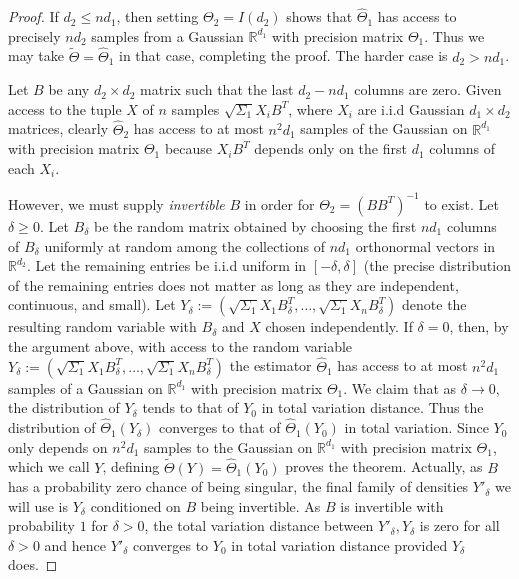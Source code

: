 \documentclass[aos]{imsart}
\theoremstyle{definition}
\numberwithin{equation}{section}
\newcommand{\R}{{\mathbb{R}}}
\newcommand{\htheta}{\widehat{\Theta}}
\begin{document}
\begin{proof}
If $d_2 \leq nd_1$, then setting $\Theta_2 = I(d_2)$ shows that $\htheta_1$ has access to precisely $n d_2$ samples from a Gaussian $\R^{d_1}$ with precision matrix $\Theta_1$. Thus we may take $\tilde{\Theta} = \htheta_1$ in that case, completing the proof. The harder case is $d_2 > n d_1$. 

Let $B$ be any $d_2\times d_2$ matrix such that the last $d_2 - nd_1$ columns are zero. Given access to the tuple $X$ of $n$ samples $\sqrt{\Sigma_1} X_i B^T$, where $X_i$ are i.i.d Gaussian $d_1\times d_2$ matrices, clearly $\widehat{\Theta}_2$ has access to at most $n^2 d_1$ samples of the Gaussian on $\R^{d_1}$ with precision matrix $\Theta_1$ because $X_i B^T$ depends only on the first $d_1$ columns of each $X_i$.

However, we must supply \emph{invertible} $B$ in order for $\Theta_2 = (BB^T)^{-1}$ to exist. Let $\delta \geq 0$. Let $B_\delta$ be the random matrix obtained by choosing the first $nd_1$ columns of $B_\delta$ uniformly at random among the collections of $nd_1$ orthonormal vectors in $\R^{d_2}$. Let the remaining entries be i.i.d uniform in $[-\delta, \delta]$ (the precise distribution of the remaining entries does not matter as long as they are independent, continuous, and small). Let $Y_\delta:=(\sqrt{\Sigma_1} X_1 B_\delta^T, \dots, \sqrt{\Sigma_1} X_n B_\delta^T)$ denote the resulting random variable with $B_\delta$ and $X$ chosen independently. If $\delta = 0$, then, by the argument above, with access to the random variable $Y_\delta:=(\sqrt{\Sigma_1} X_1 B_\delta^T, \dots, \sqrt{\Sigma_1} X_n B_\delta^T)$ the estimator $\widehat{\Theta}_1$ has access to at most $n^2d_1$ samples of a Gaussian on $\R^{d_1}$ with precision matrix $\Theta_1$. We claim that as $\delta \to 0$, the distribution of $Y_\delta$ tends to that of $Y_0$ in total variation distance. Thus the distribution of $\widehat{\Theta}_1(Y_\delta)$ converges to that of $\widehat{\Theta}_1(Y_0)$ in total variation. Since $Y_0$ only depends on $n^2d_1$ samples to the Gaussian on $\R^{d_1}$ with precision matrix $\Theta_1$, which we call $Y$, defining $\tilde{\Theta}(Y) = \widehat{\Theta}_1(Y_0)$ proves the theorem. Actually, as $B$ has a probability zero chance of being singular, the final family of densities $Y'_\delta$ we will use is $Y_\delta$ conditioned on $B$ being invertible. As $B$ is invertible with probability $1$ for $\delta > 0$, the total variation distance between $Y'_\delta, Y_\delta$ is zero for all $\delta > 0$ and hence $Y'_\delta$ converges to $Y_0$ in total variation distance provided $Y_\delta$ does.


\end{proof}
\end{document}
